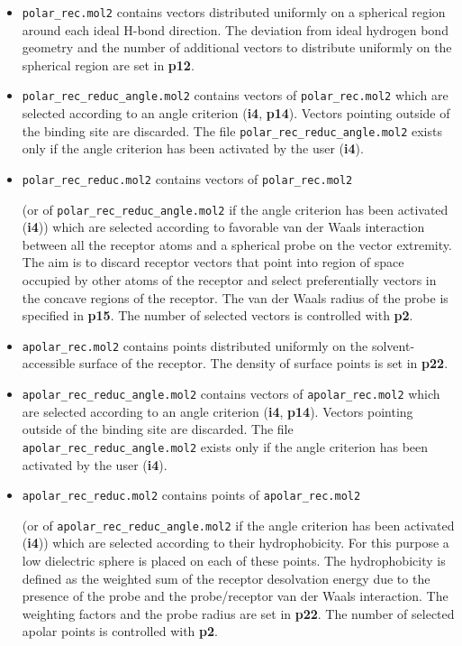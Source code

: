 \documentclass[a4paper,12pt,titlepage]{article}
\begin{document}
\begin{itemize}

\item
{\tt polar\_rec.mol2} contains vectors distributed uniformly on a spherical region 
around each ideal H-bond direction. The deviation from ideal hydrogen bond geometry 
and the number of additional vectors to distribute uniformly on the spherical region 
are set in {\bf p12}.

\item
{\tt polar\_rec\_reduc\_angle.mol2} contains vectors of {\tt polar\_rec.mol2} which 
are selected according to an angle criterion ({\bf i4}, {\bf p14}). Vectors pointing 
outside of the binding site are discarded. The file {\tt polar\_rec\_reduc\_angle.mol2} 
exists only if the angle criterion has been activated by the user ({\bf i4}).

\item
{\tt polar\_rec\_reduc.mol2} contains vectors of {\tt polar\_rec.mol2} 

\vspace{-0.2cm}
(or of {\tt polar\_rec\_reduc\_angle.mol2} if the angle criterion has been activated ({\bf i4})) 
which are selected according to favorable 
van der Waals interaction between all the receptor atoms and a spherical probe 
on the vector extremity. The aim is to discard receptor vectors that 
point into region of space occupied by other atoms of the receptor and select 
preferentially vectors in the concave regions of the receptor. The van der Waals 
radius of the probe is specified in {\bf p15}. The number of selected 
vectors is controlled with {\bf p2}. 
\item
{\tt apolar\_rec.mol2} contains points distributed uniformly on the solvent-accessible 
surface of the receptor. The density of surface points is set in {\bf p22}.

\item
{\tt apolar\_rec\_reduc\_angle.mol2} contains vectors of {\tt apolar\_rec.mol2} which 
are selected according to an angle criterion ({\bf i4}, {\bf p14}). Vectors pointing 
outside of the binding site are discarded. The file {\tt apolar\_rec\_reduc\_angle.mol2} 
exists only if the angle criterion has been activated by the user ({\bf i4}).

\item
{\tt apolar\_rec\_reduc.mol2} contains points of {\tt apolar\_rec.mol2} 

\vspace{-0.2cm}
(or of {\tt apolar\_rec\_reduc\_angle.mol2} if the angle criterion has been activated ({\bf i4})) 
which are selected 
according to their hydrophobicity. For this purpose a low dielectric sphere is placed on 
each of these points. The hydrophobicity is defined as the weighted sum of the receptor desolvation 
energy due to the presence of the probe and the probe/receptor van der Waals interaction. 
The weighting factors and the probe radius are set in {\bf p22}. The number of 
selected apolar points is controlled with {\bf p2}.


\end{itemize}
\end{document}
